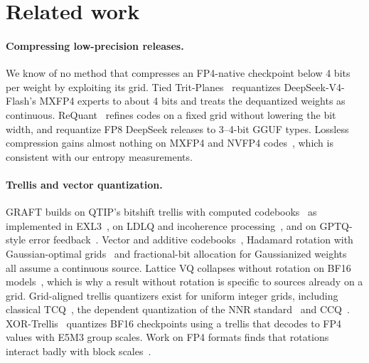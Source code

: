 \section{Related work}
\label{sec:related}

\paragraph{Compressing low-precision releases.} We know of no method that compresses an FP4-native checkpoint below 4
bits per weight by exploiting its grid. Tied Trit-Planes~\citep{grella2026trit} requantizes DeepSeek-V4-Flash's MXFP4
experts to about 4 bits and treats the dequantized weights as continuous. ReQuant~\citep{requant2026} refines codes on
a fixed grid without lowering the bit width, and \citet{zhao2025deepseek} requantize FP8 DeepSeek releases to
3--4-bit GGUF types. Lossless compression gains almost nothing on MXFP4 and NVFP4 codes~\citep{heilper2025lossless},
which is consistent with our entropy measurements.

\paragraph{Trellis and vector quantization.} GRAFT builds on QTIP's bitshift trellis with computed
codebooks~\citep{tseng2024qtip} as implemented in EXL3~\citep{exllamav3}, on LDLQ and incoherence
processing~\citep{chee2023quip,tseng2024quipsharp}, and on GPTQ-style error
feedback~\citep{frantar2022obc,frantar2023gptq}. Vector and additive
codebooks~\citep{egiazarian2024aqlm,vanbaalen2024gptvq,liu2024vptq,malinovskii2024pvtuning}, Hadamard rotation with
Gaussian-optimal grids~\citep{higgs2025} and fractional-bit allocation for Gaussianized weights~\citep{qpalette2025}
all assume a continuous source. Lattice VQ collapses without rotation on BF16 models~\citep{llvq2026}, which is why a
result without rotation is specific to sources already on a grid. Grid-aligned trellis quantizers exist for
uniform integer grids, including classical TCQ~\citep{marcellin1990tcq}, the dependent quantization of the NNR
standard~\citep{nnr2022} and CCQ~\citep{ccq2025}. XOR-Trellis~\citep{que2026xortrellis} quantizes BF16 checkpoints
using a trellis that decodes to FP4 values with E5M3 group scales. Work on FP4 formats finds that rotations interact
badly with block scales~\citep{egiazarian2025mrgptq,shao2025blockrot,jokar2026inversion}.


